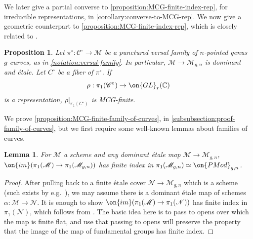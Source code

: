 \documentclass[12 pt]{amsart}
\theoremstyle{plain}
\newtheorem{proposition}[subsubsection]{Proposition}
\newtheorem{lemma}[subsubsection]{Lemma}
\theoremstyle{definition}
\theoremstyle{remark}
\numberwithin{equation}{section}
\begin{document}
We later give a partial converse to \autoref{proposition:MCG-finite-index-rep},
for irreducible representations, in \autoref{corollary:converse-to-MCG-rep}.
We now give a geometric counterpart to
\autoref{proposition:MCG-finite-index-rep},
which is closely related to \cite[Theorem A1]{CH:isomonodromic}.
\begin{proposition}
\label{proposition:MCG-finite-family-of-curves}
Let $\pi^\circ: \mathscr{C}^\circ\to \mathscr{M}$ be a punctured versal family
of $n$-pointed genus $g$ curves, as in \autoref{notation:versal-family}. In
particular, $\mathscr M \to \mathscr M_{g,n}$ is dominant and \'etale.
	Let $C^\circ$ be a fiber of $\pi^\circ$. If
	$$\rho:\pi_1(\mathscr{C}^\circ)\to \on{GL}_r(\mathbb{C})$$ is a representation, $\rho|_{\pi_1(C^\circ)}$ is MCG-finite.
\end{proposition}
We prove \autoref{proposition:MCG-finite-family-of-curves}, in
\autoref{subsubsection:proof-family-of-curves},
but we first require some well-known lemmas about families of curves. 
\begin{lemma}
	\label{lemma:finite-index-from-dominant-map}
	For $\mathscr M$ a scheme and any dominant \'etale map
	$\mathscr M \to \mathscr M_{g,n}$,
	$\on{im}(\pi_1(\mathscr M) \to \pi_1(\mathscr M_{g,n}))$
	has finite index in 
$\pi_1(\mathscr M_{g,n})\simeq \on{PMod}_{g,n}$.
\end{lemma}
\begin{proof}
	After pulling back to a finite \'etale cover $\mathscr
	N \to \mathscr M_{g,n}$ which is a scheme (such exists by e.g.~\cite[Proposition 2.3.4]{pikaart-dejong}),
	we may assume there is a dominant \'etale map of schemes
	$\alpha: \mathscr M \to \mathscr N$. It is enough to show $\on{im}(\pi_1(\mathscr M) \to \pi_1(\mathscr N))$
	has finite index in $\pi_1(\mathscr N)$, which follows from \cite[Lemma
	4.19]{debarre:higher-dimensional}.
	The basic idea here is to pass to opens over which the map is finite
	flat, and use that passing to opens will preserve the property that the
	image of the map of fundamental groups has finite index.
%
\end{proof}
\end{document}

